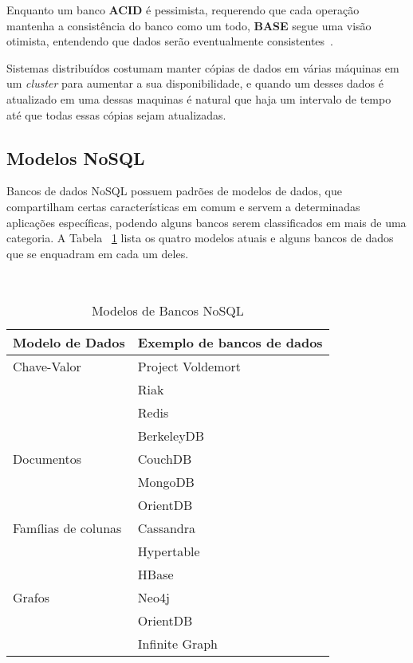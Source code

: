 Enquanto um banco \textbf{ACID} é pessimista, requerendo que cada operação mantenha a consistência do banco como um todo, \textbf{BASE} segue uma visão otimista, entendendo que dados serão eventualmente consistentes~\cite{pritchett2008}.

Sistemas distribuídos costumam manter cópias de dados em várias máquinas em um \emph{cluster} para aumentar a sua disponibilidade, e quando um desses dados é atualizado em uma dessas maquinas é natural que haja um intervalo de tempo até que todas essas cópias sejam atualizadas.

\subsection{Modelos NoSQL}
Bancos de dados NoSQL possuem padrões de modelos de dados, que compartilham certas características em comum e servem a determinadas aplicações específicas, podendo alguns bancos serem classificados em mais de uma categoria. A Tabela ~\ref{tab:modelosnosql} lista os quatro modelos atuais e alguns bancos de dados que se enquadram em cada um deles.

~\begin{table}[]
	\centering
	\caption{Modelos de Bancos NoSQL}
	\label{tab:modelosnosql}
	\begin{tabular}{ll}
		\textbf{Modelo de Dados}     & \textbf{Exemplo de bancos de dados}      \\ \hline
		Chave-Valor         & Project Voldemort               \\
		& Riak                            \\
		& Redis                           \\
		& BerkeleyDB                      \\ \hline
		Documentos          & CouchDB                         \\
		& MongoDB                         \\
		& OrientDB                        \\ \hline
		Famílias de colunas & Cassandra                       \\
		& Hypertable                      \\
		& HBase                           \\ \hline
		Grafos              & Neo4j \\
		& OrientDB                        \\
		& Infinite Graph                 
	\end{tabular}
\end{table}

